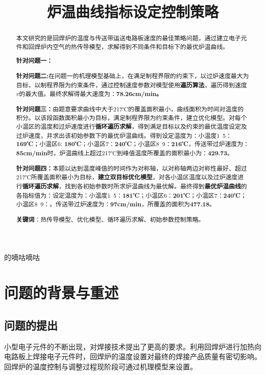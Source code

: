 \documentclass[withoutpreface,bwprint]{cumcmthesis} %
\title{炉温曲线指标设定控制策略}
\numberwithin{equation}{subsection}
\begin{document}
的嘀咕嘀咕

 \maketitle
 \begin{abstract}
本文研究的是回焊炉的温度与传送带运送电路板速度的最佳策略问题，通过建立电子元件和回焊炉内空气的热传导模型，求解得到不同条件和目标下的最优炉温曲线。

\textbf{针对问题一：}

\textbf{针对问题二:}在问题一的机理模型基础上，在满足制程界限的约束下，以过炉速度最大为目标，以制程界限为约束条件，通过控制速度参数对模型使用\textbf{遍历算法}，遍历得到速度$v$的最大值。最终求解得最大速度为：\textbf{78.26cm/min。}

\textbf{针对问题三：}由题意要求曲线中大于217℃的覆盖面积最小，曲线面积为时间对温度的积分。以该段函数面积最小为目标，满足制程界限为约束条件，建立优化模型。对每个小温区的温度和过炉速度进行\textbf{循环遍历求解}，得到满足目标以及约束的最优温度设定及过炉速度，并求出该初始参数下的最优炉温曲线。得到设定温度为：小温度1~5：\textbf{169℃}；小温区6: \textbf{180℃}；小温区7：\textbf{240℃}；小温区8~9：\textbf{216℃}，传送带过炉速度为：\textbf{85cm/min}时，炉温曲线上超过217℃到峰值温度所覆盖的面积最小为：\textbf{429.73}。

\textbf{针对问题四：}本题以达到温度峰值的时间作为对称轴，以对称轴两边对称性最好、超过217℃所覆盖面积最小为目标，\textbf{建立双目标优化模型}，对各小温区温度以及过炉速度进行\textbf{循环遍历求解}，找到各初始参数时所求炉温曲线为最优解。最终得到\textbf{最优炉温曲线}的各指标值为：设定温度为：小温度1~5：\textbf{181℃}；小温区6：\textbf{201℃}；小温区7：\textbf{240℃}；小温区8~9：。传送带过炉速度为：\textbf{97cm/min}，所覆盖的面积为\textbf{477.18}。

\textbf{关键词}：热传导模型、优化模型、循环遍历求解、初始参数控制策略。
\end{abstract}





\section{问题的背景与重述}

\subsection{问题的提出}
小型电子元件的不断出现，对焊接技术提出了更高的要求。利用回焊炉进行加热向电路板上焊接电子元件时，回焊炉的温度设置对最终的焊接产品质量有密切影响。回焊炉的温度控制与调整过程现阶段可通过机理模型来设置。
\end{document}
